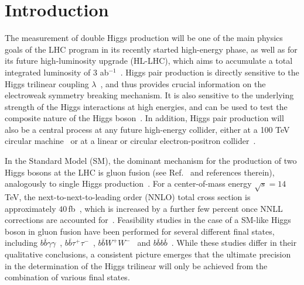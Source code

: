 \section{Introduction}

The measurement of double Higgs production will be one of the main
physics goals of the LHC program in its recently started high-energy
phase, as well as for its future high-luminosity upgrade (HL-LHC),
which aims to accumulate a total integrated
luminosity of 3 ab$^{-1}$~\cite{ATLAS:2013hta}.
%
Higgs pair production is directly sensitive to the
Higgs trilinear coupling $\lambda$~\cite{baglio}, and thus 
provides crucial
information on the electroweak symmetry breaking mechanism.
%
It is also sensitive to the underlying strength of the Higgs interactions
at high energies, and can be used to test the composite nature of the 
Higgs boson~\cite{Giudice:2007fh,Contino:2010mh}.
%
In addition, Higgs pair production will also be a central process at
any future high-energy 
collider, either at a 100 TeV circular machine~\cite{Barr:2014sga} or at
a linear or circular electron-positron collider~\cite{Contino:2013gna}.

In the Standard Model (SM), the dominant mechanism for the production of two Higgs bosons at the LHC is 
gluon fusion (see Ref.~\cite{baglio} and references therein), analogously to single Higgs production~\cite{Dittmaier:2012vm}.
%
For a center-of-mass energy $\sqrt{s} = 14\,$TeV, the next-to-next-to-leading order (NNLO)
total cross section is approximately $40\,$fb~\cite{deFlorian:2013jea},
which is increased by a further few percent once NNLL corrections
are accounted for~\cite{deFlorian:2015moa}.
%
Feasibility studies in the case of a SM-like Higgs boson
in gluon fusion have been performed for several different final states, including
$b\bar b\gamma\gamma$~\cite{Baur:2003gp,Barger:2013jfa},
$b\bar{b}\tau^+\tau^-$~\cite{Baur:2003gpa,Barr:2013tda,Dolan:2012rv,Dolan:2013rja},
$b\bar{b}W^+W^-$~\cite{Dolan:2012rv,Papaefstathiou:2012qe} and
$b\bar{b}b\bar{b}$~\cite{Baur:2003gpa,Dolan:2012rv,Wardrope:2014kya,deLima:2014dta}.
%
While these studies differ in their qualitative conclusions,
a consistent picture emerges 
that the ultimate precision in the determination of the Higgs trilinear
will only be achieved from the combination of various final states.


